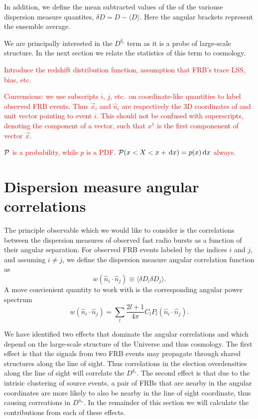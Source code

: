\documentclass[onecolumn,prd,noshowpacs,nofootinbib,amsmath,amssymb]{revtex4}
\newcommand{\ud}{\,\mathrm{d}}
\newcommand{\Dne}{D^{\bar{n}_e}}
\newcommand{\Dde}{D^{\delta_e}}
\newcommand{\del}{\delta\!}
\newcommand{\calP}{{\cal P}}
\newcommand{\red}{\textcolor{red}}
\begin{document}
In addition, we define the mean subtracted values of the of the variouse dispersion
measure quantites, $\del D = D - \langle D \rangle$. Here the angular brackets represent
the ensemble average.

We are principally interested in the $D^{\delta_e}$ term as it is a probe of
large-scale structure. In the next section we relate the statistics of this
term to cosmology.

\red{Introduce the redshift distribution function, assumption that FRB's trace
LSS, bias, etc.}

\red{Convensions: we use subscripts $i$, $j$, etc.~on coordinate-like
    quantities to label observed FRB events. Thus $\vec x_i$ and $\hat{n}_i$
    are respectively the 3D coordinates of and unit vector pointing to event $i$.
    This should not be confused with superscripts, denoting the
component of a vector, such that $x^1$ is the first componenent of vector $\vec
x$.  }

\red{$\calP$ is a probability, while $p$ is a PDF. $\calP(x < X < x + \ud x) =
p(x) \ud x$ always.}


\section{Dispersion measure angular correlations}

The principle observable which we would like to consider is the correlations
between the dispersion measures of observed fast radio bursts as a function of
their angular separation.  For observed FRB events labeled by the indices $i$
and $j$, and assuming $i \neq j$, we define the dispersion measure angular
correlation function as
\begin{equation}
    w(\hat{n}_i\cdot\hat{n}_j) \equiv \langle \del D_i \del D_j \rangle.
\end{equation}
A move convienient quantity to work with is the corresponding angular
power spectrum
\begin{equation}
w(\hat{n}_i \cdot\hat{n}_j) = \sum_l \frac{2l+1}{4 \pi} C_l
P_l(\hat{n}_i\cdot\hat{n}_j).
\end{equation}

We have identified two effects that dominate the angular
correlations and which depend on the large-scale structure of the Universe and
thus cosmology.  The first effect is that the signals from two FRB events may
propagate through shared structures along the line of sight.  Thus correlations
in the election overdensities along the line of sight will correlate the 
$\Dde$.  The second effect is that due to the intrisic clustering of source
events, a pair of FRBs that are nearby in the angular coordinates are more
likely to also be nearby in the line of sight coordinate, thus causing
correations in $\Dne$.  In the remainder of this section we will calculate the
contributions from each of these effects.
\end{document}
